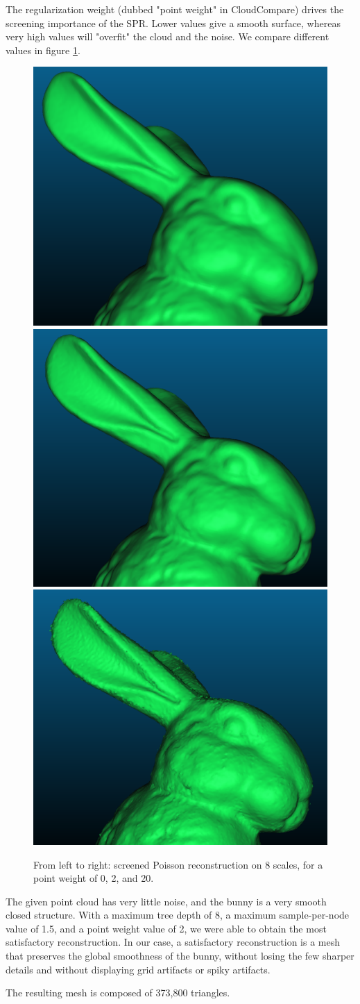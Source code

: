\documentclass[a4paper]{article}
\begin{document}
The regularization weight (dubbed "point weight" in CloudCompare) drives the screening
importance of the SPR. Lower values give a smooth surface, whereas very high values will
"overfit" the cloud and the noise. We compare different values in figure \ref{fig:SPR_pw}.
\begin{figure}[ht]
    \centering
    \includegraphics[width=0.3\linewidth]{figures/n=08_00_pw.png}
    \includegraphics[width=0.3\linewidth]{figures/n=08_2_pw.png}
        \includegraphics[width=0.3\linewidth]{figures/n=08_20_pw.png}
    \caption{From left to right: screened Poisson reconstruction on 8 scales, for a point weight of 0, 2, and 20.}
    \label{fig:SPR_pw}
\end{figure}


The given point cloud has very little noise, and the bunny is a very smooth closed structure.
With a maximum tree depth of 8, a maximum sample-per-node value of 1.5, and a point weight value
of 2, we were able to obtain the most satisfactory reconstruction. In our case, a satisfactory
reconstruction is a mesh that preserves the global smoothness of the bunny, without losing
the few sharper details and without displaying grid artifacts or spiky artifacts.

The resulting mesh is composed of 373,800 triangles.
\end{document}
